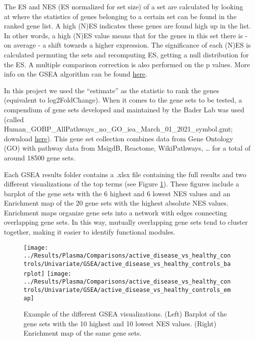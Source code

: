 \documentclass[
]{book}
\begin{document}
The ES and NES (ES normalized for set size) of a set are calculated by looking at where the statistics of genes belonging to a certain set can be found in the ranked gene list. A high (N)ES indicates these genes are found high up in the list. In other words, a high (N)ES value means that for the genes in this set there is - on average - a shift towards a higher expression. The significance of each (N)ES is calculated permuting the sets and recomputing ES, getting a null distribution for the ES. A multiple comparison correction is also performed on the p values. More info on the GSEA algorithm can be found \href{https://bioinformatics.mdanderson.org/MicroarrayCourse/Lectures09/gsea1_bw.png}{here}.

In this project we used the ``estimate'' as the statistic to rank the genes (equivalent to log2FoldChange). When it comes to the gene sets to be tested, a compendium of gene sets developed and maintained by the Bader Lab was used (called Human\_GOBP\_AllPathways\_no\_GO\_iea\_March\_01\_2021\_symbol.gmt; download \href{http://download.baderlab.org/EM_Genesets/March_01_2021/Human/symbol/Human_GOBP_AllPathways_no_GO_iea_March_01_2021_symbol.gmt}{here}). This gene set collection combines data from Gene Ontology (GO) with pathway data from MsigdB, Reactome, WikiPathways, \ldots{} for a total of around 18500 gene sets.

Each GSEA results folder contains a .xlsx file containing the full results and two different visualizations of the top terms (see Figure \ref{fig:gseaPlots}). These figures include a barplot of the gene sets with the 6 highest and 6 lowest NES values and an Enrichment map of the 20 gene sets with the highest absolute NES values. Enrichment maps organize gene sets into a network with edges connecting overlapping gene sets. In this way, mutually overlapping gene sets tend to cluster together, making it easier to identify functional modules.

\begin{figure}

{\centering \texttt{[image: ../Results/Plasma/Comparisons/active\_disease\_vs\_healthy\_controls/Univariate/GSEA/active\_disease\_vs\_healthy\_controls\_barplot]} \texttt{[image: ../Results/Plasma/Comparisons/active\_disease\_vs\_healthy\_controls/Univariate/GSEA/active\_disease\_vs\_healthy\_controls\_emap]} 

}

\caption{Example of the different GSEA visualizations. (Left)  Barplot of the gene sets with the 10 highest and 10 lowest NES values. (Right) Enrichment map of the same gene sets.}\label{fig:gseaPlots}
\end{figure}
\end{document}
